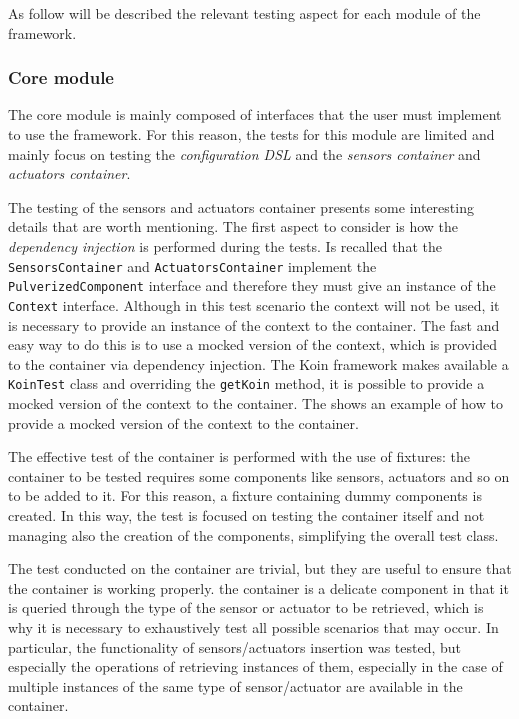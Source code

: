 As follow will be described the relevant testing aspect for each module of the framework.

\subsubsection{Core module}

The core module is mainly composed of interfaces that the user must implement to use the framework. For this reason, the tests for this module
are limited and mainly focus on testing the \emph{configuration DSL} and the \emph{sensors container} and \emph{actuators container}.

The testing of the sensors and actuators container presents some interesting details that are worth mentioning.
The first aspect to consider is how the \emph{dependency injection} is performed during the tests. Is recalled that the \texttt{SensorsContainer} and
\texttt{ActuatorsContainer} implement the \texttt{PulverizedComponent} interface and therefore they must give an instance of the \texttt{Context}
interface. Although in this test scenario the context will not be used, it is necessary to provide an instance of the context to the container.
The fast and easy way to do this is to use a mocked version of the context, which is provided to the container via dependency injection.
The Koin framework makes available a \texttt{KoinTest} class and overriding the \texttt{getKoin} method, it is possible to provide a mocked version
of the context to the container. The  shows an example of how to provide a mocked version of the context to the container.



The effective test of the container is performed with the use of fixtures: the container to be tested requires some components like sensors, actuators
and so on to be added to it. For this reason, a fixture containing dummy components is created.
In this way, the test is focused on testing the container itself and not managing also the creation of the components, simplifying the overall test
class.

The test conducted on the container are trivial, but they are useful to ensure that the container is working properly.
the container is a delicate component in that it is queried through the type of the sensor or actuator to be retrieved, which is why it is necessary
to exhaustively test all possible scenarios that may occur. In particular, the functionality of sensors/actuators insertion was tested, but especially
the operations of retrieving instances of them, especially in the case of multiple instances of the same type of sensor/actuator are available in the
container.


